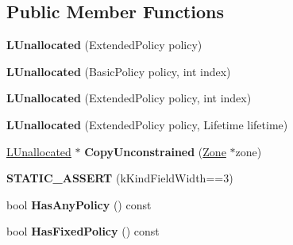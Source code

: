 \subsection*{Public Member Functions}
\begin{DoxyCompactItemize}
\item 
\hypertarget{classv8_1_1internal_1_1_l_unallocated_a24f0daf9f2809e84ac9fca0359be7d76}{}{\bfseries L\+Unallocated} (Extended\+Policy policy)\label{classv8_1_1internal_1_1_l_unallocated_a24f0daf9f2809e84ac9fca0359be7d76}

\item 
\hypertarget{classv8_1_1internal_1_1_l_unallocated_a410c7a1f66d1d62fbb531bde5b224421}{}{\bfseries L\+Unallocated} (Basic\+Policy policy, int index)\label{classv8_1_1internal_1_1_l_unallocated_a410c7a1f66d1d62fbb531bde5b224421}

\item 
\hypertarget{classv8_1_1internal_1_1_l_unallocated_a0903fb62f9817044371a139b0b4dd191}{}{\bfseries L\+Unallocated} (Extended\+Policy policy, int index)\label{classv8_1_1internal_1_1_l_unallocated_a0903fb62f9817044371a139b0b4dd191}

\item 
\hypertarget{classv8_1_1internal_1_1_l_unallocated_a866dd337593553a2f2377455c5d51ed2}{}{\bfseries L\+Unallocated} (Extended\+Policy policy, Lifetime lifetime)\label{classv8_1_1internal_1_1_l_unallocated_a866dd337593553a2f2377455c5d51ed2}

\item 
\hypertarget{classv8_1_1internal_1_1_l_unallocated_aee545f3bdf602936d36982ae7ad7a1ed}{}\hyperlink{classv8_1_1internal_1_1_l_unallocated}{L\+Unallocated} $\ast$ {\bfseries Copy\+Unconstrained} (\hyperlink{classv8_1_1internal_1_1_zone}{Zone} $\ast$zone)\label{classv8_1_1internal_1_1_l_unallocated_aee545f3bdf602936d36982ae7ad7a1ed}

\item 
\hypertarget{classv8_1_1internal_1_1_l_unallocated_aca594cf6e339fcc0e76f51b6b806454c}{}{\bfseries S\+T\+A\+T\+I\+C\+\_\+\+A\+S\+S\+E\+R\+T} (k\+Kind\+Field\+Width==3)\label{classv8_1_1internal_1_1_l_unallocated_aca594cf6e339fcc0e76f51b6b806454c}

\item 
\hypertarget{classv8_1_1internal_1_1_l_unallocated_aafcd2f07f29f9e56166d63bc880499dc}{}bool {\bfseries Has\+Any\+Policy} () const \label{classv8_1_1internal_1_1_l_unallocated_aafcd2f07f29f9e56166d63bc880499dc}

\item 
\hypertarget{classv8_1_1internal_1_1_l_unallocated_ac73653e1b921ffa8333dd9299a981c58}{}bool {\bfseries Has\+Fixed\+Policy} () const \label{classv8_1_1internal_1_1_l_unallocated_ac73653e1b921ffa8333dd9299a981c58}


\end{DoxyCompactItemize}
